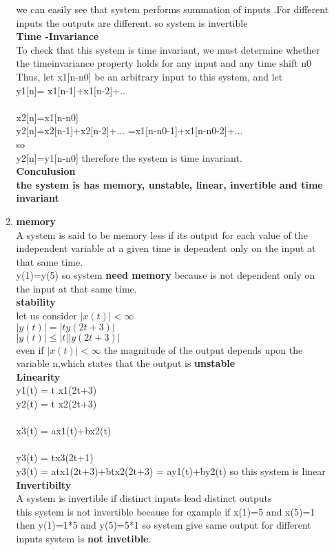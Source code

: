 \documentclass[10pt,a4paper, margin=1in]{article}
\begin{document}
\begin{enumerate}
\begin{enumerate}
	we can easily see that system performs summation of inputs .For different inputs  the outputs are different. so system is invertible\\ 
	\textbf{Time -Invariance} \\
	To check that this system is time invariant, we must determine whether the timeinvariance property holds for any input and any time shift n0 Thus, let x1[n-n0] be an arbitrary input to this system, and let \\
	y1[n]= x1[n-1]+x1[n-2]+.. \\ \\ 
	x2[n]=x1[n-n0] \\
	y2[n]=x2[n-1]+x2[n-2]+... =x1[n-n0-1]+x1[n-n0-2]+... \\
	so \\
	y2[n]=y1[n-n0] therefore the system is time invariant. \\ 
	\textbf{Conculusion} \\
	\textbf{the system is has memory, unstable, linear, invertible and time invariant}
	
	
	
	
    \item %
    	\textbf{memory} \\
    	A system is said to be memory less if its output for each value of the independent variable
at a given time is dependent only on the input at that same time.\\

   	y(1)=y(5) so system \textbf{ need memory } because is not dependent only on the input at that same time. \\
   		\textbf{stability} \\
   	let us consider $|x(t)|< \infty$ \\
   	$|y(t)|=|ty(2t+3)|$ \\
   	$|y(t)| \leq |t||y(2t+3)|$ \\
   	even if $|x(t)|< \infty$ the magnitude of the output depends upon the variable n,which states that the output is \textbf{unstable }\\
   	\textbf{Linearity} \\
   	y1(t) = t x1(2t+3) \\ 
   	y2(t) = t x2(2t+3) \\
   	\\
   	x3(t) = ax1(t)+bx2(t) \\
   	 \\
   	 y3(t) = tx3(2t+1)
   	 \\
   	 y3(t) = atx1(2t+3)+btx2(2t+3) = ay1(t)+by2(t) so this system is linear\\
   	 \textbf{Invertibilty} \\
	A system is invertible if distinct inputs lead distinct outputs \\
	this system is not invertible because for example if x(1)=5 and x(5)=1 then y(1)=1*5 and y(5)=5*1 so system give same output for different inputs system is \textbf{ not invetible}.\\
	

\end{enumerate}
\end{enumerate}
\end{document}
